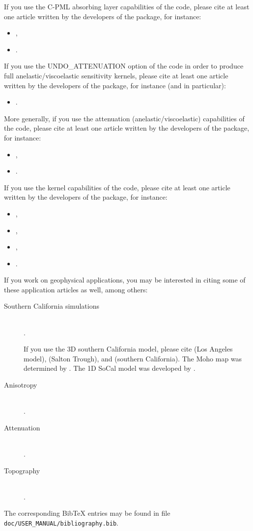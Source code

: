 If you use the C-PML absorbing layer capabilities of the code, please cite at least one article
written by the developers of the package, for instance:
%
\begin{itemize}
\item \cite{XiKoMaMa14},
\item \cite{XiMaCrKoMa16}.
\end{itemize}
%
If you use the UNDO\_ATTENUATION option of the code in order to produce full anelastic/viscoelastic sensitivity kernels, please cite at least one article
written by the developers of the package, for instance (and in particular):
%
\begin{itemize}
\item \cite{KoXiBoPeSaLiTr16}.
\end{itemize}
%
More generally, if you use the attenuation (anelastic/viscoelastic) capabilities of the code, please cite at least one article
written by the developers of the package, for instance:
%
\begin{itemize}
\item \cite{KoXiBoPeSaLiTr16},
\item \cite{BlKoChLoXi16}.
\end{itemize}
%
If you use the kernel capabilities of the code, please cite at least one article
written by the developers of the package, for instance:
%
\begin{itemize}
\item \cite{TrKoLi08},
\item \cite{PeKoLuMaLeCaLeMaLiBlNiBaTr11},
\item \cite{LiTr06},
\item \cite{MoLuTr09}.
\end{itemize}

\noindent If you work on geophysical applications, you may be interested
in citing some of these application articles as well, among others:
\begin{description}
\item [{Southern California simulations}] ~\\
 \citet{KoLiTrSuStSh04,KrJiKoTr06a,KrJiKoTr06b}.


If you use the 3D southern California model, please cite \citet{SuSh03}
(Los Angeles model), \citet{lovelyetal06} (Salton Trough), and \citet{hauksson2000}
(southern California). The Moho map was determined by \citet{zhukanamori2000}.
The 1D SoCal model was developed by \citet{DrHe90}.

\item [{Anisotropy}] ~\\
 \citet{ChTr07,JiTsKoTr05,ChFaKo04,FaChKo04,RiRiKoTrHe02,TrKo00}.
\item [{Attenuation}] ~\\
 \citet{SaKoTr10,KoTr02a,KoTr99}.
\item [{Topography}] ~\\
 \citet{LeKoHuTr09,LeChKoHuTr09,LeChLiKoHuTr08,GoAmTaCaSmSaMaKo09,WiKoScTr04}.
\end{description}
The corresponding Bib\TeX{} entries may be found in file \texttt{doc/USER\_MANUAL/bibliography.bib}.


